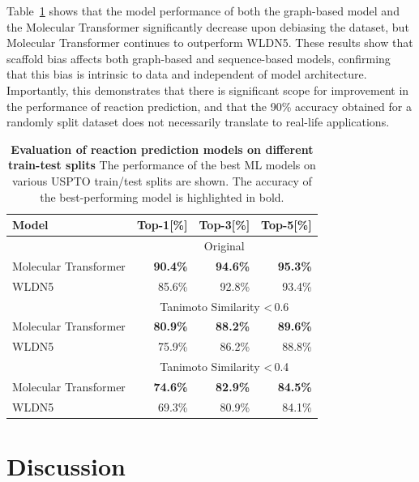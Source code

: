 Table~\ref{table:tanimoto} shows that the model performance of both the graph-based model and the Molecular Transformer significantly decrease upon debiasing the dataset, but Molecular Transformer continues to outperform WLDN5.  These results show that scaffold bias affects both graph-based and sequence-based models, confirming that this bias is intrinsic to data and independent of model architecture. Importantly, this demonstrates that there is significant scope for improvement in the performance of reaction prediction, and that the 90\% accuracy obtained for a randomly split dataset does not necessarily translate to real-life applications.

\begin{table}[!h]
    \centering
    \caption{ \textbf{Evaluation of reaction prediction models on different train-test splits} The performance of the best ML models on various USPTO train/test splits are shown. The accuracy of the best-performing model is highlighted in bold.}
    \centering
    \label{table:tanimoto}
    \begin{tabular*}{0.8\textwidth}{l@{\extracolsep{\fill}}rrr}
    \toprule
        \textbf{Model} & \textbf{Top-1[\%]} & \textbf{Top-3[\%]} & \textbf{Top-5[\%]}\\ 
        \midrule 
    & \multicolumn{3}{c}{Original} \\
    \midrule
    Molecular Transformer & \textbf{90.4\%} & \textbf{94.6\%} & \textbf{95.3\%}  \\
    WLDN5 & 85.6\% & 92.8\% & 93.4\%  \\
    \midrule 
    & \multicolumn{3}{c}{Tanimoto Similarity \textless\,0.6} \\
    \midrule
    Molecular Transformer & \textbf{80.9\%} & \textbf{88.2\%} & \textbf{89.6\%}  \\
    WLDN5 & 75.9\% & 86.2\% & 88.8\%  \\
    \midrule
    & \multicolumn{3}{c}{Tanimoto Similarity \textless\,0.4}\\
    \midrule
    Molecular Transformer & \textbf{74.6\%} & \textbf{82.9\%} & \textbf{84.5\%} \\
    WLDN5 & 69.3\% & 80.9\% & 84.1\% \\
    \bottomrule
    \end{tabular*}
\end{table}

\section{Discussion}

